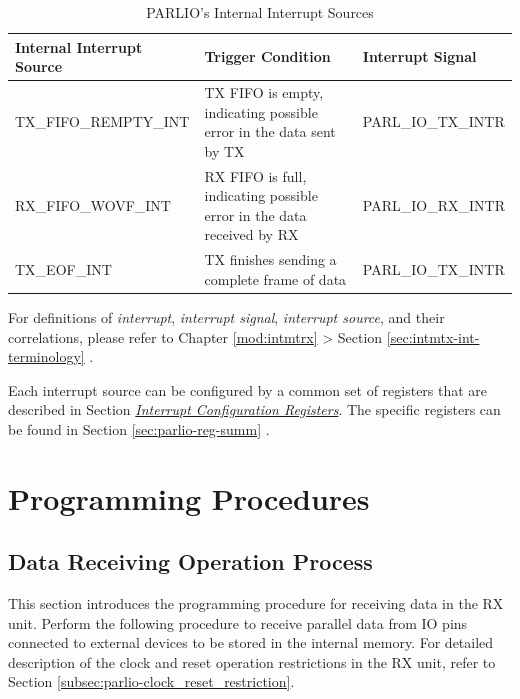 \documentclass[main\_\_EN.tex]{subfiles}
\begin{document}
\begin{longtable}{ | L{4cm} | L{7.5cm} | L{4cm} | }
\caption{PARLIO's Internal Interrupt Sources} \label{tab:parlio-int-sources}
\\ \hline
{}
\textbf{Internal Interrupt Source} & \textbf{Trigger Condition}  &  \textbf{Interrupt Signal}\\ \hline
\label{int:TXFIFOREMPTYINT}TX\_FIFO\_REMPTY\_INT  &  TX FIFO is empty, indicating possible error in the data sent by TX &  PARL\_IO\_TX\_INTR \\ \hline
\label{int:RXFIFOWOVFINT}RX\_FIFO\_WOVF\_INT &  RX FIFO is full, indicating possible error in the data received by RX & PARL\_IO\_RX\_INTR \\ \hline
\label{int:TXEOFINT}TX\_EOF\_INT & TX finishes sending a complete frame of data & PARL\_IO\_TX\_INTR \\ \hline
\end{longtable}

\begin{tiplisting}
For definitions of \textit{interrupt}, \textit{interrupt signal}, \textit{interrupt source}, and their correlations, please refer to Chapter \ref{mod:intmtrx} \textit{} > Section \ref{sec:intmtx-int-terminology} \textit{}.
\end{tiplisting}

Each interrupt source can be configured by a common set of registers that are described in Section \hyperref[interrupt-config-registers]{\textit{Interrupt Configuration Registers}}. The specific registers can be found in Section \ref{sec:parlio-reg-summ} \textit{}.



\section{Programming Procedures}
\label{sec:parlio-prog-procedures}

\subsection{Data Receiving Operation Process}

This section introduces the programming procedure for receiving data in the RX unit. Perform the following procedure to receive parallel data from IO pins connected to external devices to be stored in the internal memory. For detailed description of the clock and reset operation restrictions in the RX unit, refer to Section \ref{subsec:parlio-clock_reset_restriction}.
\end{document}
